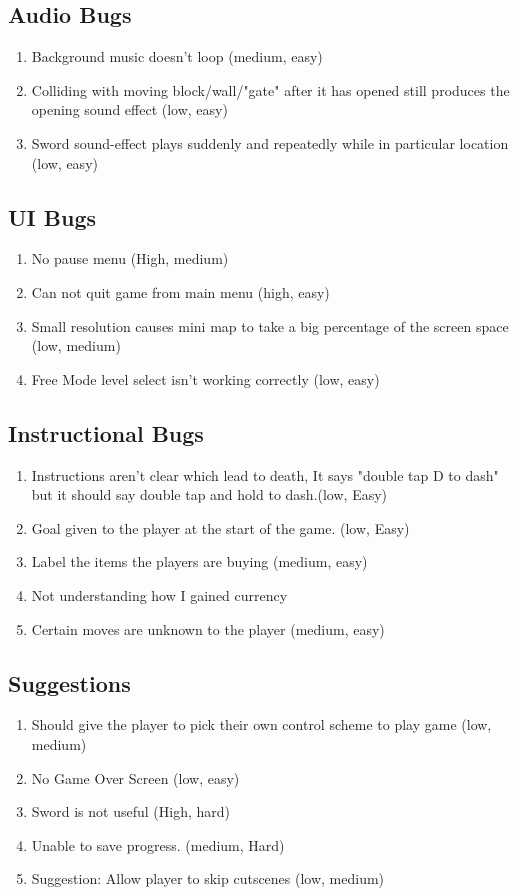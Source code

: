\documentclass{article}
\begin{document}
\subsection*{Audio Bugs}
\begin{enumerate}
	\item Background music doesn't loop (medium, easy)
		\item Colliding with moving block/wall/"gate" after it has opened still produces the opening sound effect (low, easy)
			\item Sword sound-effect plays suddenly and repeatedly while in particular location (low, easy)
\end{enumerate}
\subsection*{UI Bugs}
\begin{enumerate}
		\item No pause menu (High, medium)
			\item Can not quit game from main menu (high, easy)
				\item Small resolution causes mini map to take a big percentage of the screen space (low, medium)
					\item Free Mode level select isn't working correctly (low, easy)
				
\end{enumerate}
\subsection*{Instructional Bugs}
\begin{enumerate}
	\item Instructions aren't clear which lead to death, It says "double tap D to dash" but it should say double tap and hold to dash.(low, Easy)
	\item Goal given to the player at the start of the game.  (low, Easy)
		\item  Label the items the players are buying (medium, easy)
			\item Not understanding how I gained currency
				\item Certain moves are unknown to the player  (medium, easy)
\end{enumerate}
\subsection*{Suggestions}
\begin{enumerate}
	\item  Should give the player to pick their own control scheme to play game (low, medium)
		\item No Game Over Screen (low, easy)
			\item Sword is not useful  (High, hard)
				\item Unable to save progress. (medium, Hard)
					\item Suggestion: Allow player to skip cutscenes (low, medium)
				\end{enumerate} 
\end{document}
